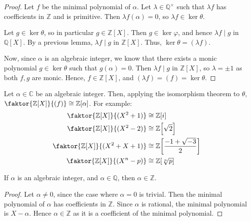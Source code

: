 \begin{proof}
	Let \( f \) be the minimal polynomial of \( \alpha \).
	Let \( \lambda \in \mathbb Q^\times \) such that \( \lambda f \) has coefficients in \( \mathbb Z \) and is primitive.
	Then \( \lambda f(\alpha) = 0 \), so \( \lambda f \in \ker \theta \).

	Let \( g \in \ker \theta \), so in particular \( g \in \mathbb Z[X] \).
	Then \( g \in \ker \varphi \), and hence \( \lambda f \mid g \) in \( \mathbb Q[X] \).
	By a previous lemma, \( \lambda f \mid g \) in \( \mathbb Z[X] \).
	Thus, \( \ker \theta = (\lambda f) \).

	Now, since \( \alpha \) is an algebraic integer, we know that there exists a monic polynomial \( g \in \ker \theta \) such that \( g(\alpha) = 0 \).
	Then \( \lambda f \mid g \) in \( \mathbb Z[X] \), so \( \lambda = \pm 1 \) as both \( f, g \) are monic.
	Hence, \( f \in \mathbb Z[X] \), and \( (\lambda f) = (f) = \ker \theta \).
\end{proof}
Let \( \alpha \in \mathbb C \) be an algebraic integer.
Then, applying the isomorphism theorem to \( \theta \), \( \faktor{\mathbb Z[X]}{(f)} \cong \mathbb Z[\alpha] \).
For example:
\begin{align*}
	\faktor{\mathbb Z[X]}{(X^2 + 1)}     & \cong \mathbb Z[i]                          \\
	\faktor{\mathbb Z[X]}{(X^2 - 2)}     & \cong \mathbb Z\qty[\sqrt{2}]               \\
	\faktor{\mathbb Z[X]}{(X^2 + X + 1)} & \cong \mathbb Z\qty[\frac{-1+\sqrt{-3}}{2}] \\
	\faktor{\mathbb Z[X]}{(X^n - p)}     & \cong \mathbb Z\qty[\sqrt[n]{p}]
\end{align*}
\begin{corollary}
	If \( \alpha \) is an algebraic integer, and \( \alpha \in \mathbb Q \), then \( \alpha \in \mathbb Z \).
\end{corollary}
\begin{proof}
	Let \( \alpha \neq 0 \), since the case where \( \alpha = 0 \) is trivial.
	Then the minimal polynomial of \( \alpha \) has coefficients in \( \mathbb Z \).
	Since \( \alpha \) is rational, the minimal polynomial is \( X - \alpha \).
	Hence \( \alpha \in \mathbb Z \) as it is a coefficient of the minimal polynomial.
\end{proof}
